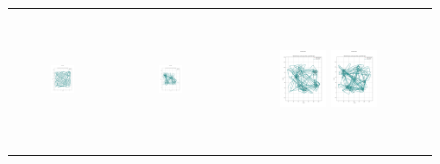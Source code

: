\begin{figure}[p]
\begin{tabular}{ccc}
        \includegraphics[height=36mm,width=0.24\textwidth]{Images/simulation_no_obs/dubins_path/11.png}
        & \includegraphics[height=36mm,width=0.24\textwidth]{Images/simulation_no_obs/dubins_path/12.png}
        & \includegraphics[height=36mm,width=0.24\textwidth]{Images/simulation_no_obs/dubins_path/13.png}
        \includegraphics[height=36mm,width=0.24\textwidth]{Images/simulation_no_obs/dubins_path/14.png}\\[-4pt]


\end{tabular}
\end{figure}

